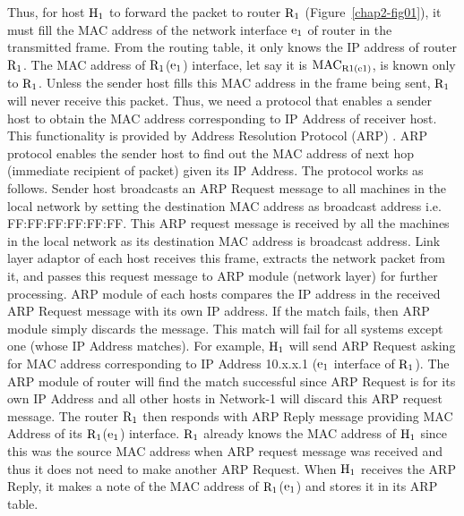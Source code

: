 \begin{multicols}{2}
Thus, for host ${\rm H}_{1}$ to forward the packet to router ${\rm R}_{1}$ (Figure~\ref{chap2-fig01}), it must fill the MAC address of the network interface ${\rm e}_{1}$ of router in the transmitted frame. From the routing table, it only knows the IP address of router ${\rm R}_{1}$. The MAC address of ${\rm R}_{1}$(${\rm e}_{1}$) interface, let say it is ${\rm MAC}_{\rm R1(e1)}$, is known only to ${\rm R}_{1}$. Unless the sender host fills this MAC address in the frame being sent, ${\rm R}_{1}$ will never receive this packet. Thus, we need a protocol that enables a sender host to obtain the MAC address corresponding to IP Address of receiver host. This functionality is provided by Address Resolution Protocol (ARP) \cite{art2-key03}. ARP protocol enables the sender host to find out the MAC address of next hop (immediate recipient of packet) given its IP Address. The protocol works as follows. Sender host broadcasts an ARP Request message to all machines in the local network by setting the destination MAC address as broadcast address i.e. FF:FF:FF:FF:FF:FF. This ARP request message is received by all the machines in the local network as its destination MAC address is broadcast address. Link layer adaptor of each host receives this frame, extracts the network packet from it, and passes this request message to ARP module (network layer) for further processing. ARP module of each hosts compares the IP address in the received ARP Request message with its own IP address.  If the match fails, then ARP module simply discards the message. This match will fail for all systems except one (whose IP Address matches). For example, ${\rm H}_{1}$ will send ARP Request asking for MAC address corresponding to IP Address 10.x.x.1 (${\rm e}_{1}$ interface of ${\rm R}_{1}$). The ARP module of router will find the match successful since ARP Request is for its own IP Address and all other hosts in Network-1 will discard this ARP request message. The router ${\rm R}_{1}$ then responds with ARP Reply message providing MAC Address of its ${\rm R}_{1}$(${\rm e}_{1}$) interface. ${\rm R}_{1}$ already knows the MAC address of ${\rm H}_{1}$ since this was the source MAC address when ARP request message was received and thus it does not need to make another ARP Request. When ${\rm H}_{1}$ receives the ARP Reply, it makes a note of the MAC address of ${\rm R}_{1}$(${\rm e}_{1}$) and stores it in its ARP table.


\end{multicols}
